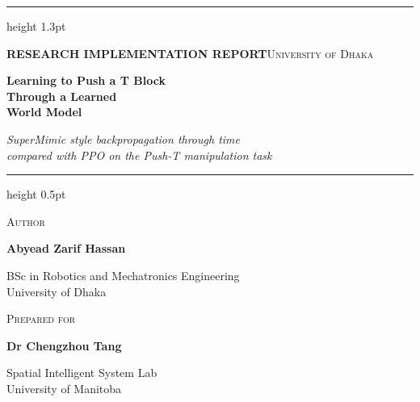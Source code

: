 \documentclass[11pt,a4paper]{article}
\begin{document}

\begin{titlepage}
\thispagestyle{empty}
\begingroup
\setlength{\parskip}{4pt}
\setlength{\parindent}{0pt}

{\color{Blue}\hrule height 1.3pt}
\vspace{0.18cm}
{\small\color{Teal}\textbf{RESEARCH IMPLEMENTATION REPORT}\hfill\color{Muted}\textsc{University of Dhaka}\par}
\vspace{1.5cm}

{\fontsize{26}{32}\selectfont\bfseries\color{Ink}
Learning to Push a T Block\\
Through a Learned\\
World Model\par}

\vspace{0.5cm}
{\large\itshape\color{Muted}
SuperMimic style backpropagation through time\\
compared with PPO on the Push-T manipulation task\par}

\vspace{0.6cm}
{\color{Rule}\hrule height 0.5pt}
\vspace{0.55cm}

\begin{minipage}[t]{0.47\textwidth}
  {\small\color{Teal}\textsc{Author}\par}
  \vspace{2pt}
  {\large\bfseries\color{Ink}Abyead Zarif Hassan\par}
  {\normalsize BSc in Robotics and Mechatronics Engineering\\University of Dhaka\par}
\end{minipage}\hfill
\begin{minipage}[t]{0.47\textwidth}
  {\small\color{Teal}\textsc{Prepared for}\par}
  \vspace{2pt}
  {\large\bfseries\color{Ink}Dr Chengzhou Tang\par}
  {\normalsize Spatial Intelligent System Lab\\University of Manitoba\par}
\end{minipage}


\end{titlepage}
\end{document}
